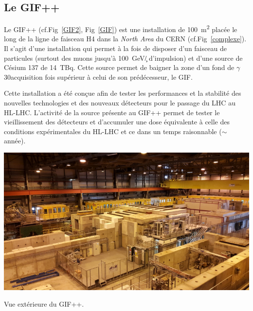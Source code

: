 \subsection{Le GIF++}
Le GIF++ \cite{Jakel:1977147} (cf.Fig~\ref{GIF2}, Fig~\ref{GIF}) est une installation de \SI{100}{\square\meter} placée le long de la ligne de faisceau H4 dans la \textit{North Area} du CERN (cf.Fig~\ref{complexe}). Il s'agit d'une installation qui permet à la fois de disposer d'un faisceau de particules (surtout des muons jusqu'à \SI{100}{\giga\eV/\c} d'impulsion) et d'une source de Césium \num{137} de \SI{14}{\tera\becquerel}. Cette source permet de baigner la zone d'un fond de $\gamma$ \num{30}acquisition fois supérieur à celui de son prédécesseur, le GIF.

Cette installation a été conçue afin de tester les performances et la stabilité des nouvelles technologies et des nouveaux détecteurs pour le passage du LHC au HL-LHC. L'activité de la source présente au GIF++ permet de tester le vieillissement des détecteurs et d'accumuler une dose équivalente à celle des conditions expérimentales du HL-LHC et ce dans un temps raisonnable ($\sim$ année). 

\marginpar
{
	\centering
	\includegraphics[width=\marginparwidth]{GLA/GIF2.png}
	\captionsetup{type=figure}\caption{Vue extérieure du GIF++.}
	\label{GIF2}
}

